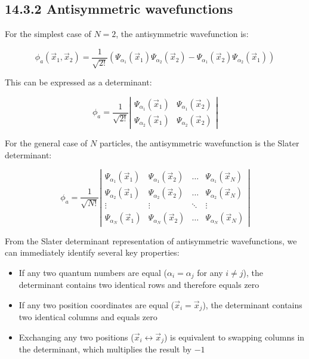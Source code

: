 \documentclass[italian]{HKNdocument}
\begin{document}
\subsection*{14.3.2 Antisymmetric wavefunctions}
For the simplest case of $N=2$, the antisymmetric wavefunction is:

\begin{equation*}
\phi_a(\vec{x}_1,\vec{x}_2)=\frac{1}{\sqrt{2!}}(\Psi_{\alpha_1}(\vec{x}_1)\Psi_{\alpha_2}(\vec{x}_2)-\Psi_{\alpha_1}(\vec{x}_2)\Psi_{\alpha_2}(\vec{x}_1)) \tag{14.25}
\end{equation*}

This can be expressed as a determinant:

\[
\phi_a=\frac{1}{\sqrt{2!}}\left|\begin{array}{ll}
\Psi_{\alpha_1}(\vec{x}_1) & \Psi_{\alpha_1}(\vec{x}_2) \tag{14.26}\\
\Psi_{\alpha_2}(\vec{x}_1) & \Psi_{\alpha_2}(\vec{x}_2)
\end{array}\right|
\]

For the general case of $N$ particles, the antisymmetric wavefunction is the Slater determinant:

\[
\phi_a=\frac{1}{\sqrt{N!}}\left|\begin{array}{cccc}
\Psi_{\alpha_1}(\vec{x}_1) & \Psi_{\alpha_1}(\vec{x}_2) & \ldots & \Psi_{\alpha_1}(\vec{x}_N) \tag{14.27}\\
\Psi_{\alpha_2}(\vec{x}_1) & \Psi_{\alpha_2}(\vec{x}_2) & \ldots & \Psi_{\alpha_2}(\vec{x}_N)\\
\vdots & \vdots & \ddots & \vdots\\
\Psi_{\alpha_N}(\vec{x}_1) & \Psi_{\alpha_N}(\vec{x}_2) & \ldots & \Psi_{\alpha_N}(\vec{x}_N)
\end{array}\right|
\]


From the Slater determinant representation of antisymmetric wavefunctions, we can immediately identify several key properties:

\begin{itemize}
  \item If any two quantum numbers are equal ($\alpha_i=\alpha_j$ for any $i\neq j$), the determinant contains two identical rows and therefore equals zero
  \item If any two position coordinates are equal ($\vec{x}_i=\vec{x}_j$), the determinant contains two identical columns and equals zero
  \item Exchanging any two positions ($\vec{x}_i \leftrightarrow \vec{x}_j$) is equivalent to swapping columns in the determinant, which multiplies the result by $-1$
\end{itemize}
\end{document}
